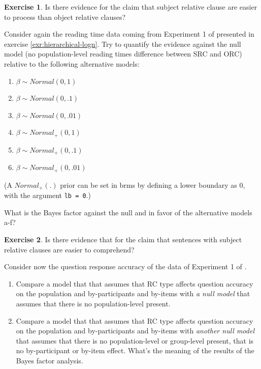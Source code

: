 \documentclass[12pt,]{krantz}
\providecommand{\tightlist}{%
  \setlength{\itemsep}{0pt}\setlength{\parskip}{0pt}}
\theoremstyle{definition}
\theoremstyle{definition}
\theoremstyle{definition}
\newtheorem{exercise}{Exercise}[chapter]
\theoremstyle{remark}
\begin{document}
\begin{exercise}
\protect\hypertarget{exr:bf-logn}{}{\label{exr:bf-logn} }Is there evidence
for the claim that subject relative clause are easier to process than
object relative clauses? \end{exercise}

Consider again the reading time data coming from Experiment 1 of
\citet{grodner} presented in exercise \ref{exr:hierarchical-logn}. Try
to quantify the evidence against the null model (no population-level
reading times difference between SRC and ORC) relative to the following
alternative models:

\begin{enumerate}
\def\labelenumi{\alph{enumi}.}
\tightlist
\item
  \(\beta \sim Normal(0, 1)\)
\item
  \(\beta \sim Normal(0, .1)\)
\item
  \(\beta \sim Normal(0, .01)\)
\item
  \(\beta \sim Normal_+(0, 1)\)
\item
  \(\beta \sim Normal_+(0, .1)\)
\item
  \(\beta \sim Normal_+(0, .01)\)
\end{enumerate}

(A \(Normal_+(.)\) prior can be set in brms by defining a lower boundary
as 0, with the argument \texttt{lb\ =\ 0}.)

What is the Bayes factor against the null and in favor of the
alternative models a-f?

\begin{exercise}
\protect\hypertarget{exr:bf-logistic}{}{\label{exr:bf-logistic} }Is there
evidence that for the claim that sentences with subject relative clauses
are easier to comprehend? \end{exercise}

\vspace{-.5cm} Consider now the question response accuracy of the data
of Experiment 1 of \citet{grodner}.

\begin{enumerate}
\def\labelenumi{\alph{enumi}.}
\tightlist
\item
  Compare a model that that assumes that RC type affects question
  accuracy on the population and by-participants and by-items with
  \emph{a null model} that assumes that there is no population-level
  present.
\item
  Compare a model that that assumes that RC type affects question
  accuracy on the population and by-participants and by-items with
  \emph{another null model} that assumes that there is no
  population-level or group-level present, that is no by-participant or
  by-item effect. What's the meaning of the results of the Bayes factor
  analysis.
\end{enumerate}
\end{document}

